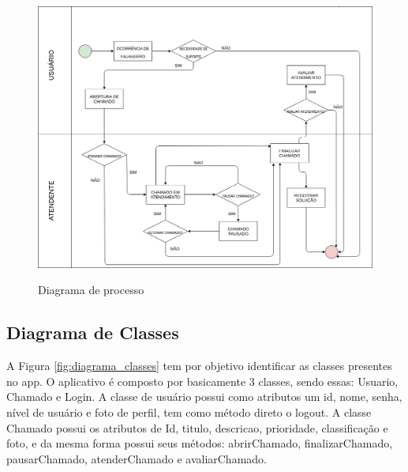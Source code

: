 \begin{figure}[htb]
     \caption{Diagrama de processo}
     \centering
     \begin{frame}{
         \includegraphics [scale = 0.41]{img/Diagramas/diagrama_processos.png}}
     \end{frame}
     \label{fig:diagrama_processos}
 \end{figure}
\newpage

\subsection{Diagrama de Classes}
A Figura \ref{fig:diagrama_classes} tem por objetivo identificar as classes presentes no app. O aplicativo é composto por basicamente 3 classes, sendo essas: Usuario, Chamado e Login.
A classe de usuário possui como atributos um id, nome, senha, nível de usuário e foto de perfil, tem como método direto o logout.
A classe Chamado possui os atributos de Id, titulo, descricao, prioridade, classificação e foto, e da mesma forma possui seus métodos: abrirChamado, finalizarChamado, pausarChamado, atenderChamado e avaliarChamado.


